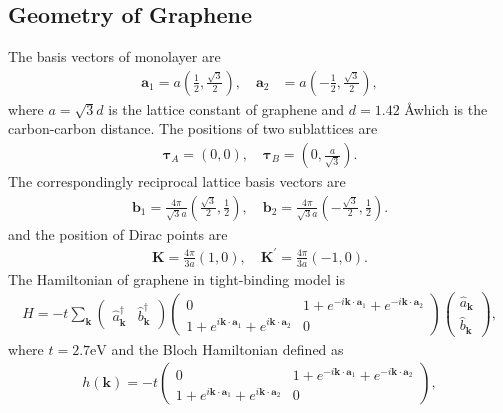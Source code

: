 \documentclass[10pt, oneside]{article}
\newcommand{\mr}[1]{\mathrm{#1}}
\newcommand{\p}[1]{\left(#1\right)}
\begin{document}
\subsection{Geometry of Graphene}
The basis vectors of monolayer are 
\begin{align}
	\bm{a}_{1} = a\p{\frac{1}{2}, \frac{\sqrt{3}}{2}} ,\quad \bm{a}_{2} &= a\p{-\frac{1}{2}, \frac{\sqrt{3}}{2}},
\end{align}
where \(a = \sqrt{3} d\) is the lattice constant of graphene and \(d = 1.42\) \AA  which is the carbon-carbon distance. The positions of two sublattices are
\begin{align}
	\bm{\tau}_{A} = \p{0, 0} , \quad \bm{\tau}_{B} = \p{0, \frac{a}{\sqrt{3}}}.
\end{align}
The correspondingly reciprocal lattice basis vectors are 
\begin{align}
	\bm{b}_{1} = \frac{4 \pi}{\sqrt{3} a} \p{\frac{\sqrt{3}}{2}, \frac{1}{2}}, \quad  \bm{b}_{2} = \frac{4 \pi}{\sqrt{3} a} \p{-\frac{\sqrt{3}}{2}, \frac{1}{2}}.
\end{align}
and the position of Dirac points are  
\begin{align}
	\bm{K} = \frac{4 \pi}{3 a}\p{1, 0}, \quad \bm{K}^{\prime} = \frac{4 \pi}{3 a}\p{-1, 0}.
\end{align} 
The Hamiltonian of graphene in tight-binding model is 
\begin{align}
	H = -t \sum_{\bm{k}} \begin{pmatrix}
		\hat{a}^{\dagger}_{\bm{k}} & \hat{b}^{\dagger}_{\bm{k}}
	   \end{pmatrix}\begin{pmatrix}
	   0 & 1+ e^{-i \bm{k} \cdot \bm{a}_{1}} + e^{-i \bm{k} \cdot \bm{a}_{2}} \\ 
	   1+ e^{i \bm{k} \cdot \bm{a}_{1}} + e^{i \bm{k} \cdot \bm{a}_{2}} & 0
	   \end{pmatrix} \begin{pmatrix}
	   \hat{a}_{\bm{k}} \\ \hat{b}_{\bm{k}}
	   \end{pmatrix},
\end{align}
where \(t = 2.7 \mr{eV}\)  and the Bloch Hamiltonian defined as 
\begin{align}
	h\left(\bm{k}\right) = - t\begin{pmatrix}
		0 & 1+ e^{-i \bm{k} \cdot \bm{a}_{1}} + e^{-i \bm{k} \cdot \bm{a}_{2}} \\ 
		1+ e^{i \bm{k} \cdot \bm{a}_{1}} + e^{i \bm{k} \cdot \bm{a}_{2}} & 0
	\end{pmatrix},
\end{align}
\end{document}
